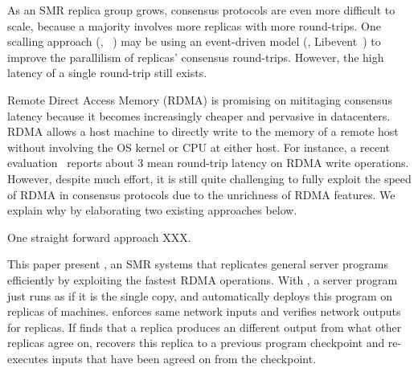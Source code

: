 As an SMR replica group grows, consensus protocols are even more difficult to 
scale, because a majority involves more replicas with more round-trips. One 
scalling approach (\eg, ~\cite{crane:sosp15}) may be using an event-driven 
model (\eg, Libevent~\cite{libevent}) to improve the parallilism of replicas' 
consensus round-trips. However, the high latency of a single round-trip still 
exists.



Remote Direct Access Memory (RDMA) is promising on mititaging consensus latency 
because it becomes increasingly cheaper and pervasive in datacenters. RDMA 
allows a host machine to directly write to the memory of a remote host without 
involving the OS kernel or CPU at either host. For instance, a recent 
evaluation~\cite{pilaf:atc14} reports about 3 \us mean round-trip latency on 
RDMA write operations. However, despite much effort, it is still quite 
challenging to fully exploit the speed of RDMA in consensus protocols due to 
the unrichness of RDMA features. We explain why by elaborating two 
existing approaches below.

One straight forward approach XXX.

This paper present \xxx, an SMR systems that replicates general server programs 
efficiently by exploiting the fastest RDMA operations. With \xxx, 
a server program just runs as if it is the single copy, and \xxx automatically 
deploys this program on replicas of machines. \xxx enforces same network 
inputs and verifies network outputs for replicas. If \xxx finds that a replica 
produces an different output from what other replicas agree on, \xxx recovers 
this replica to a previous program checkpoint and re-executes inputs that have 
been agreed on from the checkpoint. 


